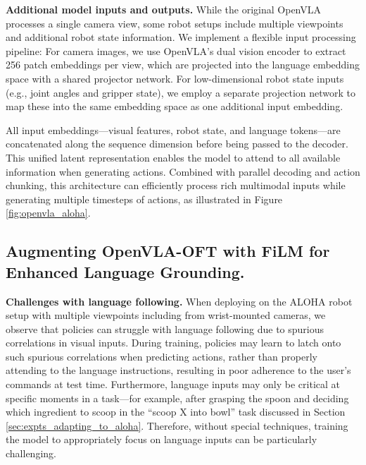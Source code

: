 \documentclass[conference]{IEEEtran}
\begin{document}
\textbf{Additional model inputs and outputs.} While the original OpenVLA processes a single camera view, some robot setups include multiple viewpoints and additional robot state information. We implement a flexible input processing pipeline: For camera images, we use OpenVLA's dual vision encoder to extract 256 patch embeddings per view, which are projected into the language embedding space with a shared projector network. For low-dimensional robot state inputs (e.g., joint angles and gripper state), we employ a separate projection network to map these into the same embedding space as one additional input embedding.

All input embeddings---visual features, robot state, and language tokens---are concatenated along the sequence dimension before being passed to the decoder. This unified latent representation enables the model to attend to all available information when generating actions. Combined with parallel decoding and action chunking, this architecture can efficiently process rich multimodal inputs while generating multiple timesteps of actions, as illustrated in Figure \ref{fig:openvla_aloha}.

















\subsection{Augmenting OpenVLA-OFT with FiLM for Enhanced Language Grounding.}
\label{sec:implementing_film}

\textbf{Challenges with language following.} When deploying on the ALOHA robot setup with multiple viewpoints including from wrist-mounted cameras, we observe that policies can struggle with language following due to spurious correlations in visual inputs. During training, policies may learn to latch onto such spurious correlations when predicting actions, rather than properly attending to the language instructions, resulting in poor adherence to the user's commands at test time. Furthermore, language inputs may only be critical at specific moments in a task---for example, after grasping the spoon and deciding which ingredient to scoop in the ``scoop X into bowl'' task discussed in Section \ref{sec:expts_adapting_to_aloha}. Therefore, without special techniques, training the model to appropriately focus on language inputs can be particularly challenging.
\end{document}
